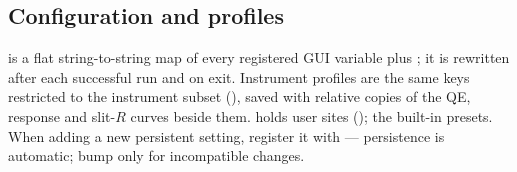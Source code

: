 \subsection{Configuration and profiles}

 is a flat string-to-string map of every
registered GUI variable plus ; it is rewritten after
each successful run and on exit. Instrument profiles are the same keys
restricted to the instrument subset (),
saved with relative copies of the QE, response and slit-$R$ curves beside
them.  holds user sites
();
 the built-in presets. When adding a new
persistent setting, register it with  ---
persistence is automatic; bump  only for
incompatible changes.
